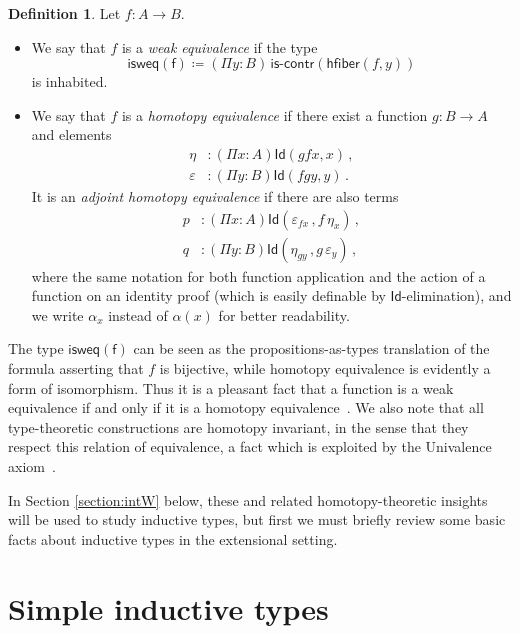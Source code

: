 \documentclass[11pt]{article}
\newcommand{\defeq}{\coloneqq}
\newcommand{\Id}{\mathsf{Id}}
\newcommand{\iscontr}{\mathsf{is}\text{-}\mathsf{contr}}
\newcommand{\hfiber}{\mathsf{hfiber}}
\theoremstyle{definition}
\newtheorem{definition}[theorem]{Definition}
\begin{document}
\begin{definition} \label{thm:weq} Let $f : A \rightarrow B$.
\begin{itemize}
%
\item We say that $f$ is a \emph{weak equivalence} if  the type
\[
\mathsf{isweq(f)} \defeq (\Pi y : B) \,  \iscontr(\hfiber(f,y)) 
\]
is inhabited. 
%
\item We say that $f$ is a \emph{homotopy equivalence} if there exist a function 
$g : B\rightarrow A$ and elements
\begin{align*}
\eta &: (\Pi x : A) \Id( g  f  x , x) \,  ,\\
\varepsilon &: (\Pi y:B) \Id( f   g  y, y) \, .
\end{align*}
It is an \emph{adjoint homotopy equivalence} if there are also
terms
\begin{align*}
p &: (\Pi x : A) \Id ( \varepsilon_{f x} \, , f \, \eta_x )  \, , \\
q &: (\Pi y : B) \Id ( \eta_{g y} \, , g \, \varepsilon_y) \, ,
\end{align*}
where the same notation for both function application and
the action of a function on an identity proof (which is easily definable by $\Id$-elimination),
and we write $\alpha_x$ instead of $\alpha(x)$ for better readability.
%
\end{itemize}
\end{definition}

The type $\mathsf{isweq(f)}$ can be seen as the propositions-as-types translation of the formula asserting that $f$ is bijective, while homotopy equivalence is evidently a form of isomorphism. Thus it is a pleasant fact that a function is a weak equivalence if and only if it is a homotopy equivalence~\cite{VoevodskyV:unifc}. 
We also note that all type-theoretic constructions are homotopy invariant, in the sense that they respect this relation of equivalence, a fact which is exploited by the Univalence axiom~\cite{VoevodskyV:notts}.


\medskip

In Section \ref{section:intW} below, these and related homotopy-theoretic insights will be used to study inductive types, but first we must briefly review some basic facts about  inductive types in the extensional setting.



\section{Simple inductive types}
\label{section:simple}
\end{document}
